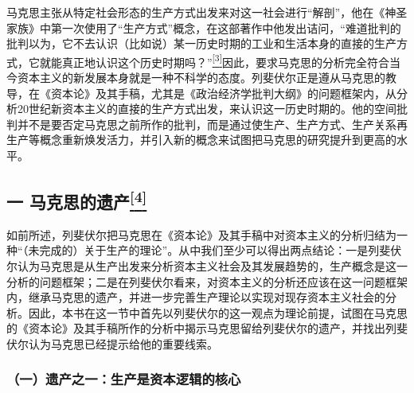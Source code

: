 \documentclass[UTF8, fontset = sourcesans, a4paper, oneside, zihao =
-4, scheme=chinese, no-math, space=true]{ctexbook}
\begin{document}
马克思主张从特定社会形态的生产方式出发来对这一社会进行``解剖''，他在《神圣家族》中第一次使用了``生产方式''概念，在这部著作中他发出诘问，``难道批判的批判以为，它不去认识（比如说）某一历史时期的工业和生活本身的直接的生产方式，它就能真正地认识这个历史时期吗？''\protect\hypertarget{part0007_split_001.htmlux5cux23w3}{}{}\protect\hyperlink{part0007_split_004.htmlux5cux23m3}{\textsuperscript{{[}3{]}}}因此，要求马克思的分析完全符合当今资本主义的新发展本身就是一种不科学的态度。列斐伏尔正是遵从马克思的教导，在《资本论》及其手稿，尤其是《政治经济学批判大纲》的问题框架内，从分析20世纪新资本主义的直接的生产方式出发，来认识这一历史时期的。他的空间批判并不是要否定马克思之前所作的批判，而是通过使生产、生产方式、生产关系再生产等概念重新焕发活力，并引入新的概念来试图把马克思的研究提升到更高的水平。

\subsection[一
马克思的遗产\protect\hyperlink{part0007_split_004.htmlux5cux23m4}{\textsuperscript{{[}4{]}}}]{\texorpdfstring{一
马克思的遗产\protect\hypertarget{part0007_split_001.htmlux5cux23w4}{}{}\protect\hyperlink{part0007_split_004.htmlux5cux23m4}{\textsuperscript{{[}4{]}}}}{一 马克思的遗产{[}4{]}}}\label{part0007_split_001.htmlux5cux23c025}

如前所述，列斐伏尔把马克思在《资本论》及其手稿中对资本主义的分析归结为一种``（未完成的）关于生产的理论''。从中我们至少可以得出两点结论：一是列斐伏尔认为马克思是从生产出发来分析资本主义社会及其发展趋势的，生产概念是这一分析的问题框架；二是在列斐伏尔看来，对资本主义的分析还应该在这一问题框架内，继承马克思的遗产，并进一步完善生产理论以实现对现存资本主义社会的分析。因此，本书在这一节中首先以列斐伏尔的这一观点为理论前提，试图在马克思的《资本论》及其手稿所作的分析中揭示马克思留给列斐伏尔的遗产，并找出列斐伏尔认为马克思已经提示给他的重要线索。

\subsubsection{（一）遗产之一：生产是资本逻辑的核心}\label{part0007_split_001.htmlux5cux23d008}
\end{document}
